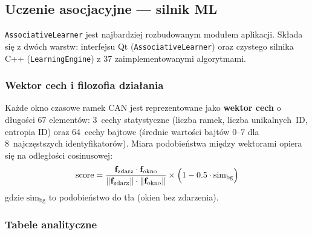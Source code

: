 \documentclass[12pt, a4paper]{article}
\begin{document}
\subsection{Uczenie asocjacyjne --- silnik ML}

\texttt{AssociativeLearner} jest najbardziej rozbudowanym modułem aplikacji.
Składa się z dwóch warstw: interfejsu Qt (\texttt{AssociativeLearner}) oraz czystego
silnika C++ (\texttt{LearningEngine}) z 37 zaimplementowanymi algorytmami.

\subsubsection*{Wektor cech i filozofia działania}

Każde okno czasowe ramek CAN jest reprezentowane jako \textbf{wektor cech}
o długości 67 elementów: 3~cechy statystyczne (liczba ramek, liczba unikalnych~ID,
entropia ID) oraz 64~cechy bajtowe (średnie wartości bajtów 0--7 dla 8~najczęstszych
identyfikatorów). Miara podobieństwa między wektorami opiera się na odległości
cosinusowej:
\[
  \text{score} = \frac{\mathbf{f}_{\text{zdarz}} \cdot \mathbf{f}_{\text{okno}}}
                      {\|\mathbf{f}_{\text{zdarz}}\| \cdot \|\mathbf{f}_{\text{okno}}\|}
                 \times \Bigl(1 - 0.5 \cdot \text{sim}_{\text{bg}}\Bigr)
\]
gdzie $\text{sim}_{\text{bg}}$ to podobieństwo do tła (okien bez zdarzenia).

\subsubsection*{Tabele analityczne}
\end{document}
